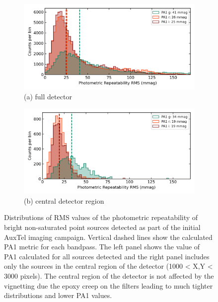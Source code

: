 \begin{figure}[ht]
\begin{subfigure}{.5\textwidth}
    \centering
    \includegraphics[width=1.0\textwidth]{figures/pa1_auxtel}
     \caption{(a) full detector}
\end{subfigure}
\begin{subfigure}{.5\textwidth} 
    \centering
    \includegraphics[width=1.0\textwidth]{figures/pa1_auxtel_central}
    \caption{(b) central detector region}
\end{subfigure}
\par\medskip 
\caption[short]{\label{fig:faro_auxtel_metrics} 
Distributions of RMS values of the photometric repeatability of  bright non-saturated  point sources detected as part of the initial AuxTel imaging campaign. Vertical dashed lines show the calculated PA1 metric for each bandpass. The left panel shows the value of PA1 calculated for all sources detected and the right panel includes only the sources in the central region of the detector (1000 < X,Y < 3000 pixels). The central region of the detector is not affected by the vignetting due the epoxy creep on the filters leading to much tighter distributions and lower PA1 values.}
\end{figure}

